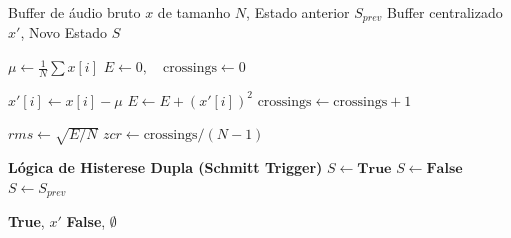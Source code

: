 \documentclass[11pt, a4paper]{article}
\theoremstyle{plain}
\theoremstyle{definition}
\begin{document}
\begin{algorithm}[H] 
\caption{Pré-processamento: Noise Gate com Histerese e ZCR}
\label{alg:preprocess}
\begin{algorithmic}[1]
\Require Buffer de áudio bruto $x$ de tamanho $N$, Estado anterior $S_{prev}$
\Ensure Buffer centralizado $x'$, Novo Estado $S$

\State $\mu \gets \frac{1}{N} \sum x[i]$ 
\State $E \gets 0, \quad \text{crossings} \gets 0$

    \State $x'[i] \gets x[i] - \mu$ 
    \State $E \gets E + (x'[i])^2$
        \State $\text{crossings} \gets \text{crossings} + 1$
    \EndIf
\EndFor

\State $rms \gets \sqrt{E / N}$
\State $zcr \gets \text{crossings} / (N-1)$

\State \textbf{Lógica de Histerese Dupla (Schmitt Trigger)}
    \State $S \gets \textbf{True}$ 
    \State $S \gets \textbf{False}$ 
\Else
    \State $S \gets S_{prev}$ 
\EndIf

    \State \Return \textbf{True}, $x'$ 
\Else
    \State \Return \textbf{False}, $\emptyset$ 
\EndIf
\end{algorithmic}
\end{algorithm}
\end{document}

